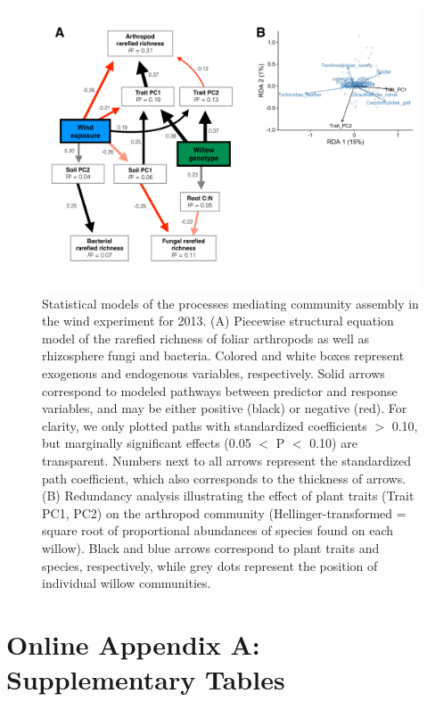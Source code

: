 \documentclass[11pt]{article}
\begin{document}
\begin{figure}%
\centering
\includegraphics[scale = 0.45]{fig_4.png}
\caption{Statistical models of the processes mediating
community assembly in the wind experiment for 2013. (A) Piecewise
structural equation model of the rarefied richness of foliar arthropods
as well as rhizosphere fungi and bacteria. Colored and white boxes represent
exogenous and endogenous variables, respectively. Solid
arrows correspond to modeled pathways between predictor and response
variables, and may be either positive (black) or negative (red). For clarity,
we only plotted paths with standardized coefficients $>$
0.10, but marginally significant effects (0.05 $<$ P $<$ 0.10) are transparent. Numbers next to all arrows represent the standardized path
coefficient, which also corresponds to the thickness of arrows. (B)
Redundancy analysis illustrating the effect of plant traits (Trait PC1, PC2) on the arthropod community (Hellinger-transformed = square root of proportional abundances of species found on each willow).
Black and blue arrows correspond to plant traits and species,
respectively, while grey
dots represent the position of individual willow communities.}
\label{wSEM}
\end{figure}

\newpage{}

\renewcommand{\thesection}{\Alph{section}}

\section*{Online Appendix A: Supplementary Tables}
\end{document}
